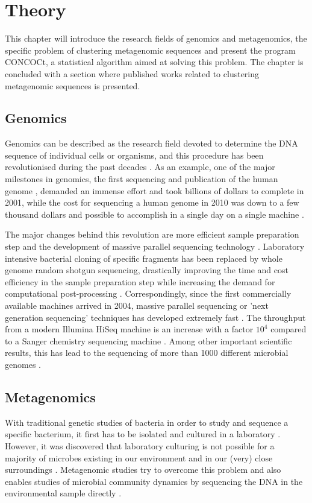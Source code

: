 \chapter{Theory}
This chapter will introduce the research fields of genomics and metagenomics, the specific problem of clustering metagenomic sequences and present the program CONCOCt, a statistical algorithm aimed at solving this problem. The chapter is concluded with a section where published works related to clustering metagenomic sequences is presented.

\section{Genomics}
Genomics can be described as the research field devoted to determine the DNA sequence of individual cells or organisms, and this procedure has been revolutionised during the past decades \parencite{Mardis2008a}. As an example, one of the major milestones in genomics, the first sequencing and publication of the human genome \parencite{Venter2001}, demanded an immense effort and took billions of dollars to complete in 2001, while the cost for sequencing a human genome in 2010 was down to a few thousand dollars and possible to accomplish in a single day on a single machine \parencite{Venter2010}.

The major changes behind this revolution are more efficient sample preparation step and the development of massive parallel sequencing technology \parencite{Mardis2008b}. Laboratory intensive bacterial cloning of specific fragments has been replaced by whole genome random shotgun sequencing, drastically improving the time and cost efficiency in the sample preparation step while increasing the demand for computational post-processing \parencite{Mardis2008b}. Correspondingly, since the first commercially available machines arrived in 2004, massive parallel sequencing or 'next generation sequencing' techniques has developed extremely fast \parencite{Mardis2008b}. The throughput from a modern Illumina HiSeq machine is an increase with a factor $10^4$ compared to a Sanger chemistry sequencing machine \parencite{Droge2012}. Among other important scientific results, this has lead to the sequencing of more than 1000 different microbial genomes \parencite{Kelley2010}.

\section{Metagenomics}
With traditional genetic studies of bacteria in order to study and sequence a specific bacterium, it first has to be isolated and cultured in a laboratory \parencite{Kelley2010}. However, it was discovered that laboratory culturing is not possible for a majority of microbes existing in our environment and in our (very) close surroundings \parencite{Hugenholtz2008b}. Metagenomic studies try to overcome this problem and also enables studies of microbial community dynamics by sequencing the DNA in the environmental sample directly \parencite{Chatterji2008}. 
 
